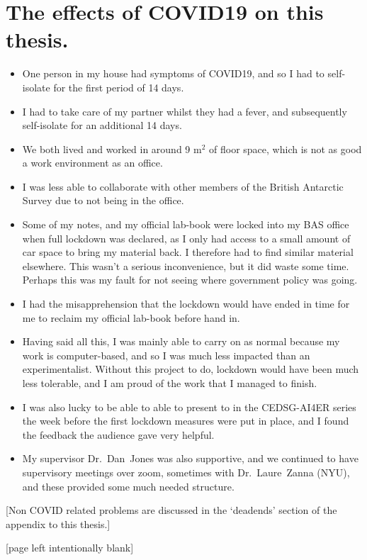 
\section*{The effects of COVID19 on this thesis.}
\begin{itemize}

\item One person in my house had symptoms of COVID19, and so I had to self-isolate
      for the first period of 14 days.

\item I had to take care of my partner whilst
      they had a fever, and subsequently self-isolate for an additional 14 days.

\item We both lived and worked in around 9 m$^{2}$ of floor space, which is not as
      good a work environment as an office.

\item I was less able to collaborate with other members
      of the British Antarctic Survey due to not being in the office.

\item Some of my notes, and my official lab-book were locked into my BAS office when full lockdown was declared,
      as I only had access to a small amount of car space to bring my material back.
      I therefore had to find similar material elsewhere. This wasn't a serious inconvenience,
      but it did waste some time. Perhaps this was my fault for not seeing where government policy was going.

\item I had the misapprehension that the lockdown would have ended in time for me to
      reclaim my official lab-book before hand in.

\item Having said all this, I was mainly able to carry on as normal because
      my work is computer-based, and so I was much less impacted than an experimentalist.
      Without this project to do, lockdown would have been much less tolerable,
      and I am proud of the work that I managed to finish.

\item I was also lucky to be able to able to present to in the CEDSG-AI4ER series
      the week before the first lockdown measures were put in place, and
      I found the feedback the audience gave very helpful.

\item My supervisor Dr.~Dan~Jones was also supportive,
      and we continued to have supervisory meetings over zoom,
      sometimes with Dr.~Laure~Zanna (NYU), and these provided some much
      needed structure.

\end{itemize}

[Non COVID related problems are discussed in the `deadends' section of the
appendix to this thesis.]


\newpage

[page left intentionally blank]
\newpage
